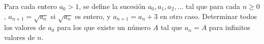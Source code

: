 Para cada entero $a_0 \gt 1$, se define la sucesión $a_0, a_1, a_2, \dots$ tal que para cada $n \ge 0$, $a_{n+1} = \sqrt{a_n}$ si $\sqrt{a_n}$ es entero, y $a_{n+1} = a_n + 3$ en otro caso.
Determinar todos los valores de $a_0$ para los que existe un número $A$ tal que $a_n = A$ para infinitos valores de $n$.